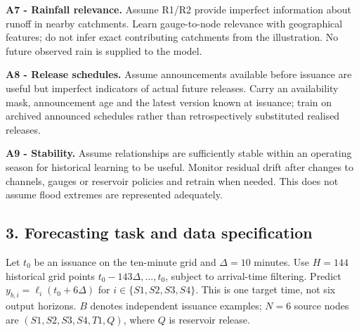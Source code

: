 \documentclass[
  10pt,
  a4paper,
]{article}
\begin{document}
\textbf{A7 - Rainfall relevance.} Assume R1/R2 provide imperfect
information about runoff in nearby catchments. Learn gauge-to-node
relevance with geographical features; do not infer exact contributing
catchments from the illustration. No future observed rain is supplied to
the model.

\textbf{A8 - Release schedules.} Assume announcements available before
issuance are useful but imperfect indicators of actual future releases.
Carry an availability mask, announcement age and the latest version
known at issuance; train on archived announced schedules rather than
retrospectively substituted realised releases.

\textbf{A9 - Stability.} Assume relationships are sufficiently stable
within an operating season for historical learning to be useful. Monitor
residual drift after changes to channels, gauges or reservoir policies
and retrain when needed. This does not assume flood extremes are
represented adequately.

\subsection{3. Forecasting task and data
specification}\label{forecasting-task-and-data-specification}

Let \(t_0\) be an issuance on the ten-minute grid and \(\Delta=10\)
minutes. Use \(H=144\) historical grid points
\(t_0-143\Delta,\ldots,t_0\), subject to arrival-time filtering. Predict
\(y_{b,i}=\ell_i(t_0+6\Delta)\) for \(i\in\{S1,S2,S3,S4\}\). This is one
target time, not six output horizons. \(B\) denotes independent issuance
examples; \(N=6\) source nodes are \((S1,S2,S3,S4,T1,Q)\), where \(Q\)
is reservoir release.
\end{document}
